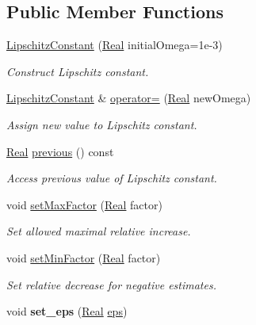 \subsection*{\-Public \-Member \-Functions}
\begin{DoxyCompactItemize}
\item 
\hyperlink{classSpacy_1_1LipschitzConstant_aa260cc7420e3f5cfc7fe2d78fb2aa7ad}{\-Lipschitz\-Constant} (\hyperlink{classSpacy_1_1Real}{\-Real} initial\-Omega=1e-\/3)
\begin{DoxyCompactList}\small\item\em \-Construct \-Lipschitz constant. \end{DoxyCompactList}\item 
\hyperlink{classSpacy_1_1LipschitzConstant}{\-Lipschitz\-Constant} \& \hyperlink{classSpacy_1_1LipschitzConstant_a7f5636d01898427c65555da9b55450dd}{operator=} (\hyperlink{classSpacy_1_1Real}{\-Real} new\-Omega)
\begin{DoxyCompactList}\small\item\em \-Assign new value to \-Lipschitz constant. \end{DoxyCompactList}\item 
\hyperlink{classSpacy_1_1Real}{\-Real} \hyperlink{classSpacy_1_1LipschitzConstant_a3a91ae4dea16ff7e83f1d51797145cbd}{previous} () const 
\begin{DoxyCompactList}\small\item\em \-Access previous value of \-Lipschitz constant. \end{DoxyCompactList}\item 
void \hyperlink{classSpacy_1_1LipschitzConstant_a5e4f00a4178814300de3f2a0ac391c1c}{set\-Max\-Factor} (\hyperlink{classSpacy_1_1Real}{\-Real} factor)
\begin{DoxyCompactList}\small\item\em \-Set allowed maximal relative increase. \end{DoxyCompactList}\item 
void \hyperlink{classSpacy_1_1LipschitzConstant_ac5dbb64f6535fe26b6f5e43c95d85282}{set\-Min\-Factor} (\hyperlink{classSpacy_1_1Real}{\-Real} factor)
\begin{DoxyCompactList}\small\item\em \-Set relative decrease for negative estimates. \end{DoxyCompactList}\item 
\hypertarget{classSpacy_1_1Mixin_1_1Eps_a818ab6dfab5e4eea583e1302bcc621f8}{void {\bfseries set\-\_\-eps} (\hyperlink{classSpacy_1_1Real}{\-Real} \hyperlink{classSpacy_1_1Mixin_1_1Eps_a812b99b0abc1d78a34b4114907f23f52}{eps})}\label{classSpacy_1_1Mixin_1_1Eps_a818ab6dfab5e4eea583e1302bcc621f8}


\end{DoxyCompactItemize}
